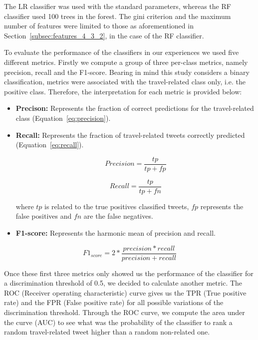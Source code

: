 The LR classifier was used with the standard parameters, whereas the RF classifier used 100 trees in the forest. The gini criterion and the maximum number of features were limited to those as aforementioned in Section~\ref{subsec:features_4_3_2}, in the case of the RF classifier.

To evaluate the performance of the classifiers in our experiences we used five different metrics. Firstly we compute a group of three per-class metrics, namely precision, recall and the F1-score. Bearing in mind this study considers a binary classification, metrics were associated with the travel-related class only, i.e. the positive class. Therefore, the interpretation for each metric is provided below:

\begin{itemize}
\item \textbf{Precison:} Represents the fraction of correct predictions for the travel-related class (Equation~\ref{eq:precision}).

\item \textbf{Recall:} Represents the fraction of travel-related tweets correctly predicted (Equation~\ref{eq:recall}).
\begin{multicols}{2}
	\begin{equation}\label{eq:precision}
		Precision = \frac{tp}{tp+fp}
    \end{equation}
    
	\begin{equation}\label{eq:recall}
		Recall = \frac{tp}{tp+fn}
	\end{equation}
\end{multicols}

where \textbf{$tp$} is related to the true positives classified tweets, \textbf{$fp$} represents the false positives and \textbf{$fn$} are the false negatives.

\item \textbf{F1-score:} Represents the harmonic mean of precision and recall.
\end{itemize}

\begin{equation}
{F1}_{score} = 2*\frac{precision*recall}{precision+recall}
\end{equation}

Once these first three metrics only showed us the performance of the classifier for a discrimination threshold of 0.5, we decided to calculate another metric. The ROC (Receiver operating characteristic) curve gives us the TPR (True positive rate) and the FPR (False positive rate) for all possible variations of the discrimination threshold. Through the ROC curve, we compute the area under the curve (AUC) to see what was the probability of the classifier to rank a random travel-related tweet higher than a random non-related one.

